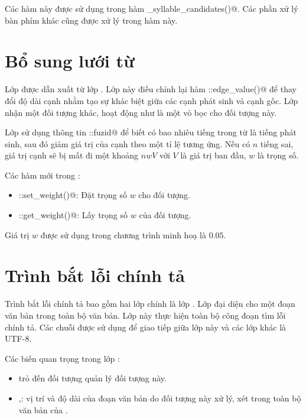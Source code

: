 \documentclass[a4paper,oneside,14pt]{extbook} %
\begin{document}
Các hàm này được sử dụng trong hàm \verb@get_syllable_candidates()@.
Các phần xử lý bàn phím khác cũng được xử lý trong hàm này.

\section{Bổ sung lưới từ}

Lớp \verb@PenaltyDAG@ được dẫn xuất từ lớp \verb@DAG@. Lớp này điều
chỉnh lại hàm \verb@DAG::edge_value()@ để thay đổi độ dài cạnh nhằm
tạo sự khác biệt giữa các cạnh phát sinh và cạnh gốc. Lớp nhận một đối
tượng \verb@DAG@ khác, hoạt động như là một vỏ bọc cho đối tượng này.

Lớp sử dụng thông tin \verb@WordEntry::fuzid@ để biết có bao nhiêu
tiếng trong từ là tiếng phát sinh, sau đó giảm giá trị của cạnh theo
một tỉ lệ tương ứng. Nếu có $n$ tiếng sai, giá trị cạnh sẽ bị mất đi
một khoảng $nwV$
với $V$ là giá trị ban đầu, $w$ là trọng số.

Các hàm mới trong \verb@PenaltyDAG@:
\begin{itemize}
\item \verb@PenaltyDAG::set_weight()@: Đặt trọng số $w$ cho đối tượng.
\item \verb@PenaltyDAG::get_weight()@: Lấy trọng số $w$ của đối tượng.
\end{itemize}

Giá trị $w$ được sử dụng trong chương trình minh hoạ là $0.05$. 

\section{Trình bắt lỗi chính tả}

Trình bắt lỗi chính tả bao gồm hai lớp chính là lớp \verb@Text@. Lớp
\verb@Text@ đại diện cho một đoạn văn bản trong toàn bộ văn bản. Lớp
này thực hiện toàn bộ công đoạn tìm lỗi chính tả. Các chuỗi được sử
dụng để giao tiếp giữa lớp này và các lớp khác là UTF-8.

Các biến quan trọng trong lớp \verb@Text@:
\begin{itemize}
\item \verb@vspell@ trỏ đến đối tượng \verb@VSpell@ quản lý đối tượng
  này.
\item \verb@offset@,\verb@length@: vị trí và độ dài của đoạn văn bản
  do đối tượng này xử lý, xét trong toàn bộ văn bản của \verb@vspell@.
\end{itemize}
\end{document}
